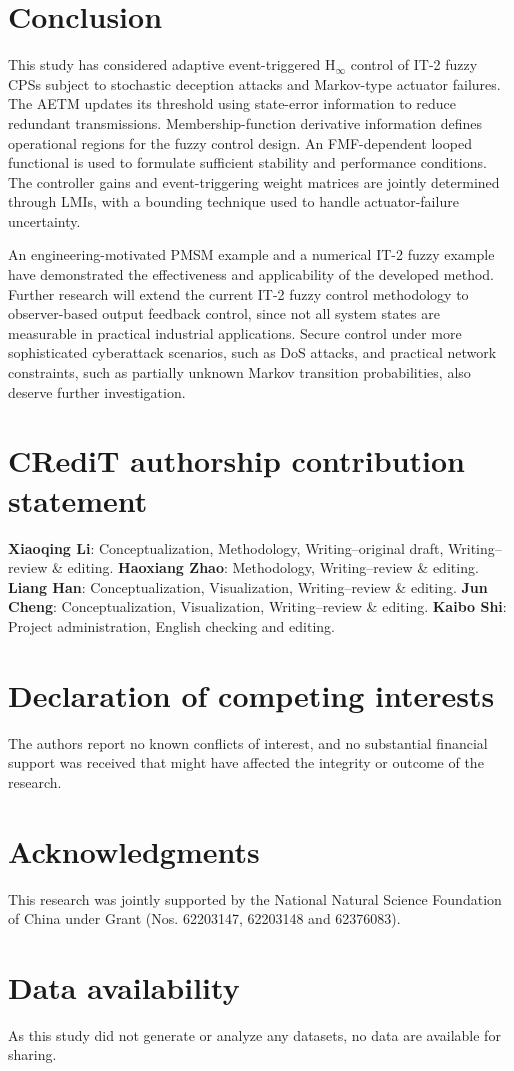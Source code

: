 \documentclass[preprint,review,fleqn,sort&compress,3p]{elsarticle}
\theoremstyle{definition} %
\theoremstyle{definition}%
\begin{document}
\section{Conclusion} \label{sec5}
This study has considered adaptive event-triggered $\mathrm{H}_{\infty}$ control of IT-2 fuzzy CPSs subject to stochastic deception attacks and Markov-type actuator failures. The AETM updates its threshold using state-error information to reduce redundant transmissions. Membership-function derivative information defines operational regions for the fuzzy control design. An FMF-dependent looped functional is used to formulate sufficient stability and performance conditions. The controller gains and event-triggering weight matrices are jointly determined through LMIs, with a bounding technique used to handle actuator-failure uncertainty.

An engineering-motivated PMSM example and a numerical IT-2 fuzzy example have demonstrated the effectiveness and applicability of the developed method. Further research will extend the current IT-2 fuzzy control methodology to observer-based output feedback control, since not all system states are measurable in practical industrial applications. Secure control under more sophisticated cyberattack scenarios, such as DoS attacks, and practical network constraints, such as partially unknown Markov transition probabilities, also deserve further investigation.


\section*{CRediT authorship contribution statement}
{\bf Xiaoqing Li}: Conceptualization, Methodology, Writing--original draft, Writing--review \& editing. %
{\bf Haoxiang Zhao}: Methodology, Writing--review \& editing. 
{\bf Liang Han}: Conceptualization, Visualization, Writing--review \& editing.
{\bf Jun Cheng}: Conceptualization, Visualization, Writing--review \& editing. 
{\bf Kaibo Shi}: Project administration, English checking and editing. 
\section*{Declaration of competing interests}
The authors report no known conflicts of interest, and no substantial financial support was received that might have affected the integrity or outcome of the research.

\section*{Acknowledgments}
This research was jointly supported by the National Natural Science Foundation of China under Grant (Nos. 62203147, 62203148 and 62376083).
\section*{Data availability}
As this study did not generate or analyze any datasets, no data are available for sharing.

\setlength{\bibsep}{0pt}
 
 
\end{document}
